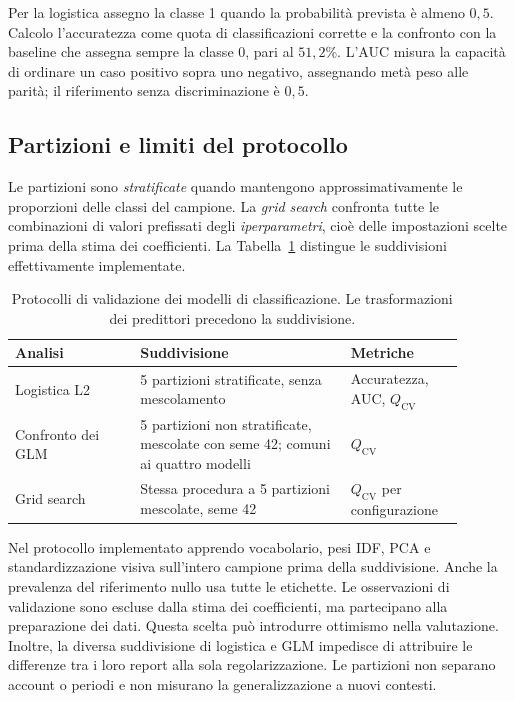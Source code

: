 Per la logistica assegno la classe 1 quando la probabilità prevista è almeno $0{,}5$. Calcolo l'accuratezza come quota di classificazioni corrette e la confronto con la baseline che assegna sempre la classe 0, pari al $51{,}2\%$. L'AUC misura la capacità di ordinare un caso positivo sopra uno negativo, assegnando metà peso alle parità; il riferimento senza discriminazione è $0{,}5$.

\subsection{Partizioni e limiti del protocollo}
\label{subsec:metodi-classificazione-validazione}

Le partizioni sono \emph{stratificate} quando mantengono approssimativamente le proporzioni delle classi del campione. La \emph{grid search} confronta tutte le combinazioni di valori prefissati degli \emph{iperparametri}, cioè delle impostazioni scelte prima della stima dei coefficienti. La Tabella~\ref{tab:associazione-validazione} distingue le suddivisioni effettivamente implementate.

\begin{table}[htbp]
    \centering\small
    \caption{Protocolli di validazione dei modelli di classificazione. Le trasformazioni dei predittori precedono la suddivisione.}
    \label{tab:associazione-validazione}
    \begin{tabular}{@{}p{0.25\linewidth}p{0.42\linewidth}p{0.22\linewidth}@{}}
        \toprule
        Analisi & Suddivisione & Metriche \\
        \midrule
        Logistica L2 & 5 partizioni stratificate, senza mescolamento & Accuratezza, AUC, $Q_{\mathrm{CV}}$ \\
        \addlinespace
        Confronto dei GLM & 5 partizioni non stratificate, mescolate con seme 42; comuni ai quattro modelli & $Q_{\mathrm{CV}}$ \\
        \addlinespace
        Grid search & Stessa procedura a 5 partizioni mescolate, seme 42 & $Q_{\mathrm{CV}}$ per configurazione \\
        \bottomrule
    \end{tabular}
\end{table}

Nel protocollo implementato apprendo vocabolario, pesi IDF, PCA e standardizzazione visiva sull'intero campione prima della suddivisione. Anche la prevalenza del riferimento nullo usa tutte le etichette. Le osservazioni di validazione sono escluse dalla stima dei coefficienti, ma partecipano alla preparazione dei dati. Questa scelta può introdurre ottimismo nella valutazione. Inoltre, la diversa suddivisione di logistica e GLM impedisce di attribuire le differenze tra i loro report alla sola regolarizzazione. Le partizioni non separano account o periodi e non misurano la generalizzazione a nuovi contesti.

